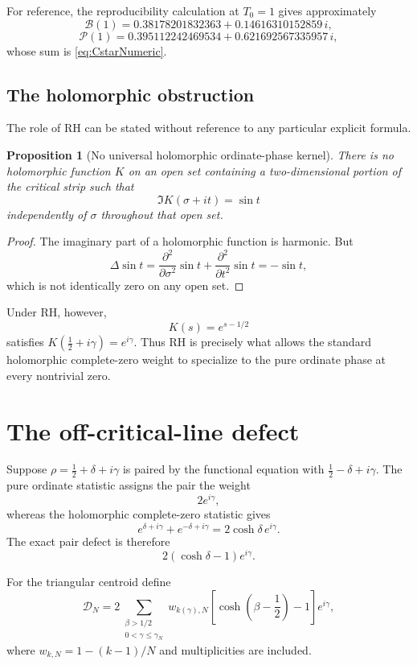 \documentclass[11pt]{article}
\newtheorem{proposition}[theorem]{Proposition}
\theoremstyle{definition}
\theoremstyle{remark}
\newcommand{\cD}{\mathcal D}
\newcommand{\cP}{\mathcal P}
\newcommand{\cB}{\mathcal B}
\begin{document}
For reference, the reproducibility calculation at $T_0=1$ gives approximately
\[
\cB(1)=0.38178201832363+0.14616310152859\,i,
\]
\[
\cP(1)=0.395112242469534+0.621692567335957\,i,
\]
whose sum is \eqref{eq:CstarNumeric}.

\subsection{The holomorphic obstruction}
The role of RH can be stated without reference to any particular explicit formula.

\begin{proposition}[No universal holomorphic ordinate-phase kernel]\label{prop:nohol}
There is no holomorphic function $K$ on an open set containing a two-dimensional portion of the critical strip such that
\[
\Im K(\sigma+it)=\sin t
\]
independently of $\sigma$ throughout that open set.
\end{proposition}
\begin{proof}
The imaginary part of a holomorphic function is harmonic.  But
\[
\Delta\sin t
=\frac{\partial^2}{\partial\sigma^2}\sin t
+\frac{\partial^2}{\partial t^2}\sin t
=-\sin t,
\]
which is not identically zero on any open set.
\end{proof}

Under RH, however,
\[
K(s)=e^{s-1/2}
\]
satisfies $K(\tfrac12+i\gamma)=e^{i\gamma}$.  Thus RH is precisely what allows the standard holomorphic complete-zero weight to specialize to the pure ordinate phase at every nontrivial zero.

\section{The off-critical-line defect}\label{sec:defect}

Suppose $\rho=\tfrac12+\delta+i\gamma$ is paired by the functional equation with $\tfrac12-\delta+i\gamma$.  The pure ordinate statistic assigns the pair the weight
\[
2e^{i\gamma},
\]
whereas the holomorphic complete-zero statistic gives
\[
e^{\delta+i\gamma}+e^{-\delta+i\gamma}
=2\cosh\delta\,e^{i\gamma}.
\]
The exact pair defect is therefore
\begin{equation}\label{eq:pairdefect}
2(\cosh\delta-1)e^{i\gamma}.
\end{equation}

For the triangular centroid define
\begin{equation}\label{eq:DN}
\boxed{
\cD_N
=2\sum_{\substack{\beta>1/2\\0<\gamma\le\gamma_N}}
 w_{k(\gamma),N}
\left[\cosh\!\left(\beta-\frac12\right)-1\right]e^{i\gamma},
}
\end{equation}
where $w_{k,N}=1-(k-1)/N$ and multiplicities are included.
\end{document}
